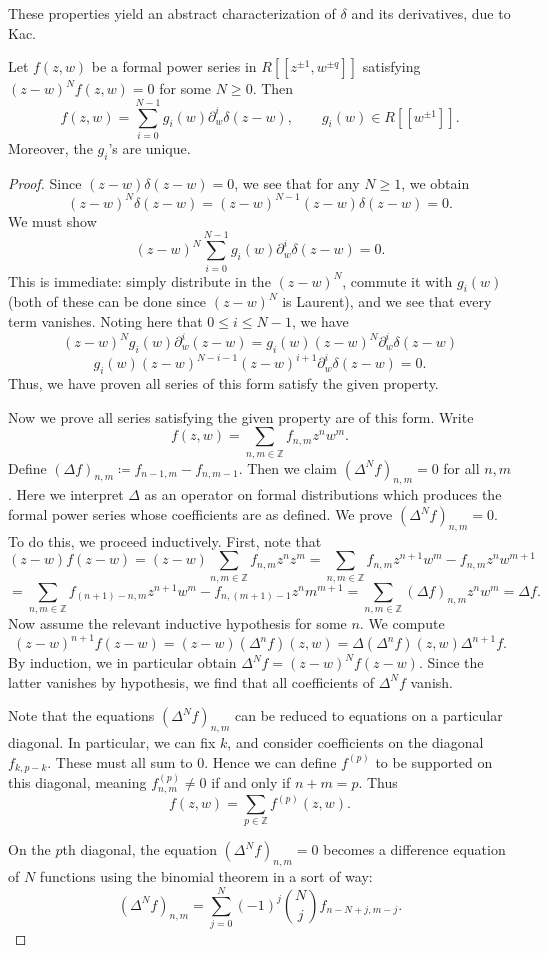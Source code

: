 These properties yield an abstract characterization of $\delta $ and its derivatives, due to Kac.
\begin{lemma}\label{lma:delta}
	Let $f(z,w)$ be a formal power series in $R[[z^{\pm 1} , w^{\pm q} ]]$ satisfying $(z-w)^Nf(z,w)=0$ for some $N \geq 0$. Then
	\[
		f(z,w) = \sum_{i=0}^{N-1} g_i(w)\partial _w^i\delta (z-w),\qquad g_i(w)\in R[[w^{\pm 1} ]]
	.\]
	Moreover, the $g_i$'s are unique.
\end{lemma}
\begin{proof}
	Since $(z-w)\delta (z-w)=0$, we see that for any $N\geq 1$, we obtain
	\[
		(z-w)^N\delta (z-w) = (z-w)^{N-1} (z-w)\delta (z-w) = 0
	.\]
	We must show
	\[
		(z-w)^N \sum_{i=0}^{N-1} g_i(w) \partial _w^i \delta (z-w)=0
	.\]
	This is immediate: simply distribute in the $(z-w)^N$, commute it with $g_i(w)$ (both of these can be done since $(z-w)^N$ is Laurent), and we see that every term vanishes. Noting here that $0 \leq i \leq N-1$, we have
	\[
		(z-w)^N g_i(w) \partial _w^i(z-w) = g_i(w) (z-w)^N \partial _w^i \delta (z-w)
	\]
	\[
		g_i(w)(z-w)^{N-i-1} (z-w)^{i+1}  \partial _w^{i} \delta (z-w)=0
	.\]
	Thus, we have proven all series of this form satisfy the given property.

	Now we prove all series satisfying the given property are of this form. Write
	\[
		f(z,w) = \sum_{n,m\in\mathbb{Z} } f_{n,m} z^nw^m
	.\]
	Define $(\Delta f)_{n,m} \coloneqq f_{n-1,m} -f_{n,m-1} $. Then we claim $(\Delta ^Nf)_{n,m} =0$ for all $n,m$. Here we interpret $\Delta $ as an operator on formal distributions which produces the formal power series whose coefficients are as defined. We prove $(\Delta ^Nf)_{n,m} =0$. To do this, we proceed inductively. First, note that
	\[
		(z-w)f(z-w) = (z-w)\sum_{n,m\in\mathbb{Z} } f_{n,m} z^nz^m = \sum_{n,m\in\mathbb{Z} } f_{n,m} z^{n+1} w^m - f_{n,m} z^nw^{m+1} 
	\]
	\[
		=\sum_{n,m\in\mathbb{Z} } f_{(n+1)-n,m} z^{n+1} w^m - f_{n,(m+1)-1} z^nm^{m+1} =\sum_{n,m\in\mathbb{Z} } (\Delta f)_{n,m} z^nw^m = \Delta f
	.\]
	Now assume the relevant inductive hypothesis for some $n$. We compute
	\[
		(z-w)^{n+1} f(z-w) = (z-w)(\Delta ^nf)(z,w) = \Delta (\Delta ^nf)(z,w) \Delta ^{n+1} f
	.\]
	By induction, we in particular obtain $\Delta ^Nf = (z-w)^Nf(z-w)$. Since the latter vanishes by hypothesis, we find that all coefficients of $\Delta ^Nf$ vanish.

	Note that the equations $(\Delta ^Nf)_{n,m} $ can be reduced to equations on a particular diagonal. In particular, we can fix $k$, and consider coefficients on the diagonal $f_{k,p-k} $. These must all sum to 0. Hence we can define $f^{(p)}$ to be supported on this diagonal, meaning $f^{(p)} _{n,m} \neq 0$ if and only if $n+m=p$. Thus
	\[
		f(z,w) = \sum_{p\in\mathbb{Z} } f^{(p)}(z,w)
	.\]

	On the $p$th diagonal, the equation $(\Delta ^Nf)_{n,m} =0$ becomes a difference equation of $N$ functions using the binomial theorem in a sort of way:
	\[
		(\Delta ^Nf)_{n,m} =\sum_{j=0}^{N} (-1)^j \binom{N}{j} f_{n-N+j,m-j}
	.\]
	
\end{proof}

